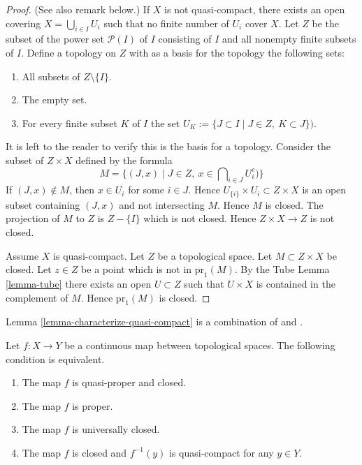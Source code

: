 \begin{proof}
(See also remark below.)
If $X$ is not quasi-compact, there exists an open covering
$X = \bigcup_{i \in I} U_i$ such that no finite
number of $U_i$ cover $X$.
Let $Z$ be the subset of the power set $\mathcal{P}(I)$ of $I$
consisting of $I$ and all nonempty finite subsets of $I$.
Define a topology on $Z$ with as a basis for the topology
the following sets:
\begin{enumerate}
\item All subsets of $Z\setminus\{I\}$.
\item The empty set.
\item For every finite subset $K$ of $I$ the set
$U_K := \{J\subset I \mid J \in Z, \ K\subset J \})$.
\end{enumerate}
It is left to the reader to verify this is the basis for a topology.
Consider the subset of $Z\times X$ defined by the formula
$$
M = \{(J, x) \mid J \in Z, \ x \in \bigcap\nolimits_{i \in J} U_i^c)\}
$$
If $(J, x) \not \in M$, then $x \in U_i$ for some $i \in J$.
Hence $U_{\{i\}} \times U_i \subset Z \times X$ is an open
subset containing $(J, x)$ and not intersecting $M$. Hence
$M$ is closed. The projection of $M$ to $Z$ is $Z-\{I\}$
which is not closed. Hence $Z \times X \to Z$ is not closed.

\medskip\noindent
Assume $X$ is quasi-compact. Let $Z$ be a topological space.
Let $M \subset  Z \times X$ be closed. Let $z \in Z$ be a point
which is not in $\text{pr}_1(M)$. By the Tube Lemma \ref{lemma-tube}
there exists an open $U \subset Z$ such that $U \times X$ is
contained in the complement of $M$. Hence $\text{pr}_1(M)$ is closed.
\end{proof}

\begin{remark}
\label{remark-lemma-literature}
Lemma \ref{lemma-characterize-quasi-compact} is a combination of
\cite[I, p. 75, Lemme 1]{Bourbaki} and
\cite[I, p. 76, Corrolaire 1]{Bourbaki}.
\end{remark}

\begin{theorem}
\label{theorem-characterize-proper}
Let $f: X\to Y$ be a continuous map between
topological spaces. The following condition is equivalent.
\begin{enumerate}
\item The map $f$ is quasi-proper and closed.
\item The map $f$ is proper.
\item The map $f$ is universally closed.
\item The map $f$ is closed and $f^{-1}(y)$ is quasi-compact for any
$y\in Y$.
\end{enumerate}
\end{theorem}

